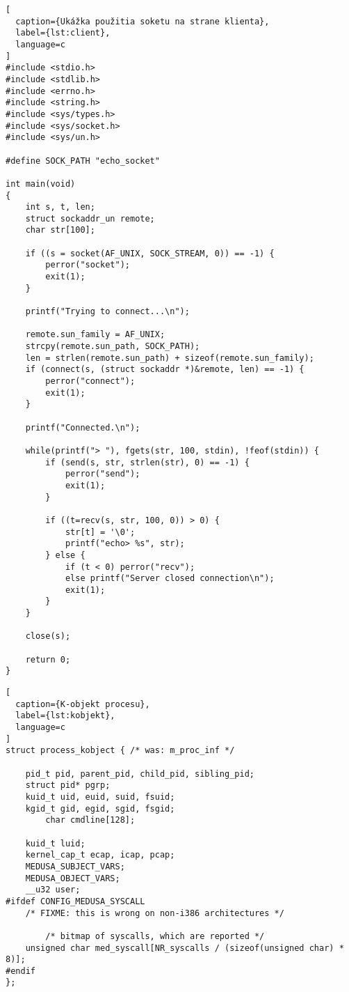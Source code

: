 \begin{lstlisting}[
  caption={Ukážka použitia soketu na strane klienta},
  label={lst:client},
  language=c
]
#include <stdio.h>
#include <stdlib.h>
#include <errno.h>
#include <string.h>
#include <sys/types.h>
#include <sys/socket.h>
#include <sys/un.h>

#define SOCK_PATH "echo_socket"

int main(void)
{
    int s, t, len;
    struct sockaddr_un remote;
    char str[100];

    if ((s = socket(AF_UNIX, SOCK_STREAM, 0)) == -1) {
        perror("socket");
        exit(1);
    }

    printf("Trying to connect...\n");

    remote.sun_family = AF_UNIX;
    strcpy(remote.sun_path, SOCK_PATH);
    len = strlen(remote.sun_path) + sizeof(remote.sun_family);
    if (connect(s, (struct sockaddr *)&remote, len) == -1) {
        perror("connect");
        exit(1);
    }

    printf("Connected.\n");

    while(printf("> "), fgets(str, 100, stdin), !feof(stdin)) {
        if (send(s, str, strlen(str), 0) == -1) {
            perror("send");
            exit(1);
        }

        if ((t=recv(s, str, 100, 0)) > 0) {
            str[t] = '\0';
            printf("echo> %s", str);
        } else {
            if (t < 0) perror("recv");
            else printf("Server closed connection\n");
            exit(1);
        }
    }

    close(s);

    return 0;
}
\end{lstlisting}

\begin{lstlisting}[
  caption={K-objekt procesu},
  label={lst:kobjekt},
  language=c
]
struct process_kobject { /* was: m_proc_inf */

	pid_t pid, parent_pid, child_pid, sibling_pid;
	struct pid* pgrp;
	kuid_t uid, euid, suid, fsuid;
	kgid_t gid, egid, sgid, fsgid;
        char cmdline[128];

	kuid_t luid;
	kernel_cap_t ecap, icap, pcap;
	MEDUSA_SUBJECT_VARS;
	MEDUSA_OBJECT_VARS;
	__u32 user;
#ifdef CONFIG_MEDUSA_SYSCALL
	/* FIXME: this is wrong on non-i386 architectures */

		/* bitmap of syscalls, which are reported */
	unsigned char med_syscall[NR_syscalls / (sizeof(unsigned char) * 8)];
#endif
};
\end{lstlisting}